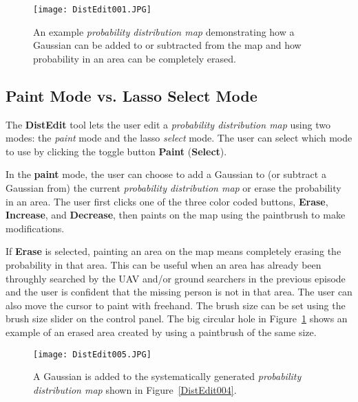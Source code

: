 \begin{figure}
\centering
\texttt{[image: DistEdit001.JPG]}
\caption[Examples of adding/subtracting a Gaussian to a probability distribution]{An example \textit{probability distribution map} demonstrating how a Gaussian can be added to or subtracted from the map and how probability in an area can be completely erased.}
\label{DistEdit001}
\end{figure}

\subsection{Paint Mode vs. Lasso Select Mode}

The \textbf{DistEdit} tool lets the user edit a \textit{probability distribution map} using two modes: the \textit{paint} mode and the lasso \textit{select} mode. The user can select which mode to use by clicking the toggle button \textbf{Paint} (\textbf{Select}). 

In the \textbf{paint} mode, the user can choose to add a Gaussian to (or subtract a Gaussian from) the current \textit{probability distribution map} or erase the probability in an area. The user first clicks one of the three color coded buttons, \textbf{Erase}, \textbf{Increase}, and \textbf{Decrease}, then paints on the map using the paintbrush to make modifications.

If \textbf{Erase} is selected, painting an area on the map means completely erasing the probability in that area. This can be useful when an area has already been throughly searched by the UAV and/or ground searchers in the previous episode and the user is confident that the missing person is not in that area. The user can also move the cursor to paint with freehand. The brush size can be set using the brush size slider on the control panel. The big circular hole in Figure~\ref{DistEdit001} shows an example of an erased area created by using a paintbrush of the same size.

\begin{figure}
\centering
\texttt{[image: DistEdit005.JPG]}
\caption[Adding a Gaussian to the systematically generated distribution]{A Gaussian is added to the systematically generated \textit{probability distribution map} shown in Figure~\ref{DistEdit004}.}
\label{DistEdit005}
\end{figure}

